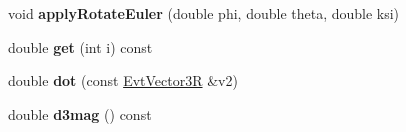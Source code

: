 \begin{DoxyCompactItemize}
\item 
\hypertarget{class_evt_vector3_r_a2be2e756bc726ed9360ec0191db35d61}{}void {\bfseries apply\+Rotate\+Euler} (double phi, double theta, double ksi)\label{class_evt_vector3_r_a2be2e756bc726ed9360ec0191db35d61}

\item 
\hypertarget{class_evt_vector3_r_aceb89f8a6d73fd456d2dd4a3222c2a6d}{}double {\bfseries get} (int i) const \label{class_evt_vector3_r_aceb89f8a6d73fd456d2dd4a3222c2a6d}

\item 
\hypertarget{class_evt_vector3_r_a1d4199540d3eecfc3a88c1d3b5380702}{}double {\bfseries dot} (const \hyperlink{class_evt_vector3_r}{Evt\+Vector3\+R} \&v2)\label{class_evt_vector3_r_a1d4199540d3eecfc3a88c1d3b5380702}

\item 
\hypertarget{class_evt_vector3_r_a202cbb59331f9ed9c0c0339c8fe65202}{}double {\bfseries d3mag} () const \label{class_evt_vector3_r_a202cbb59331f9ed9c0c0339c8fe65202}

\end{DoxyCompactItemize}
